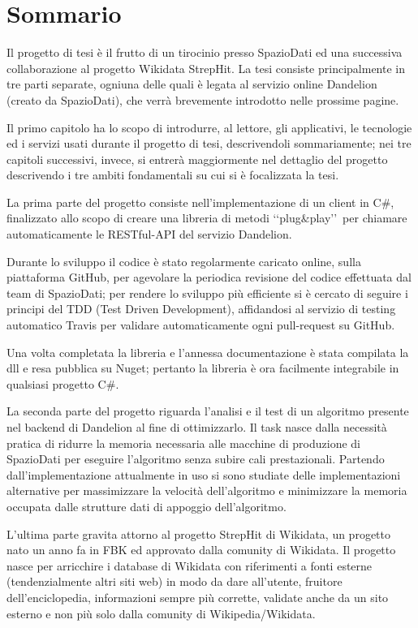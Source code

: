 \chapter*{Sommario} %
\label{sommario}

Il progetto di tesi è il frutto di un tirocinio presso SpazioDati ed una successiva collaborazione al progetto Wikidata StrepHit. La tesi consiste principalmente in tre parti separate, ogniuna delle quali è
legata al servizio online Dandelion (creato da SpazioDati), che verrà brevemente introdotto nelle prossime pagine. 

Il primo capitolo ha lo scopo di introdurre, al lettore, gli applicativi, le tecnologie ed i servizi usati durante il progetto di tesi, descrivendoli sommariamente; 
nei tre capitoli successivi, invece, si entrerà maggiormente nel dettaglio del progetto descrivendo i tre ambiti fondamentali su cui si è focalizzata la tesi.

La prima parte del progetto consiste nell'implementazione di un client in C$\#$, finalizzato allo scopo di creare una libreria di metodi \lq\lq plug$\&$play\rq\rq\ 
per chiamare automaticamente le RESTful-API del servizio Dandelion. 

Durante lo sviluppo il codice è stato regolarmente caricato online, sulla piattaforma GitHub, per agevolare la periodica revisione del codice effettuata dal team di SpazioDati; 
per rendere lo sviluppo più efficiente si è cercato di seguire i principi del TDD (Test Driven Development), affidandosi al servizio di testing automatico Travis 
per validare automaticamente ogni pull-request su GitHub. 

Una volta completata la libreria e l'annessa documentazione è stata compilata la dll e resa pubblica su Nuget; 
pertanto la libreria è ora facilmente integrabile in qualsiasi progetto C$\#$.

La seconda parte del progetto riguarda l'analisi e il test di un algoritmo presente nel backend di Dandelion al fine di ottimizzarlo. 
Il task nasce dalla necessità pratica di ridurre la memoria necessaria alle macchine di produzione di SpazioDati per eseguire l'algoritmo senza subire cali prestazionali.
Partendo dall'implementazione attualmente in uso si sono studiate delle implementazioni alternative per massimizzare la velocità dell'algoritmo e minimizzare 
la memoria occupata dalle strutture dati di appoggio dell'algoritmo. 

L'ultima parte gravita attorno al progetto StrepHit di Wikidata, un progetto nato un anno fa in FBK ed approvato dalla comunity di Wikidata. 
Il progetto nasce per arricchire i database di Wikidata con riferimenti a fonti esterne (tendenzialmente altri siti web) in modo da dare all'utente, fruitore dell'enciclopedia, informazioni sempre più corrette,
validate anche da un sito esterno e non più solo dalla comunity di Wikipedia/Wikidata.

